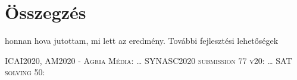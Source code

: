 \documentclass[
]{thesis-ekf}
\newtheorem{tetel}{Tétel}[chapter]
\theoremstyle{definition}
\theoremstyle{remark}
\begin{document}
%	

	
	\chapter*{Összegzés}
	honnan hova jutottam, mi lett az eredmény. További fejlesztési lehetőségek
	
	\begin{thebibliography}{2}
		\textsc{ICAI2020, AM2020 - Agria Média}: \dots
		\textsc{SYNASC2020 submission 77 v20}: \dots
		\textsc{SAT solving 50}:
	\end{thebibliography}
	
	
\end{document}
